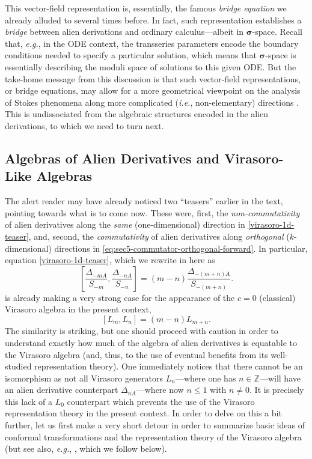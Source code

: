 \documentclass[11pt,a4paper]{article}
\def\BZ{{\mathbb Z}}
\newcommand{\be}{\begin{equation}}
\newcommand{\ee}{\end{equation}}
\begin{document}
This vector-field representation is, essentially, the famous \textit{bridge equation} we already alluded to several times before. In fact, such representation establishes a \textit{bridge} between alien derivations and ordinary calculus---albeit in $\boldsymbol{\sigma}$-space. Recall that, \textit{e.g.}, in the ODE context, the transseries parameters encode the boundary conditions needed to specify a particular solution, which means that $\boldsymbol{\sigma}$-space is essentially describing the moduli space of solutions to this given ODE. But the take-home message from this discussion is that such vector-field representations, or bridge equations, may allow for a more geometrical viewpoint on the analysis of Stokes phenomena along more complicated (\textit{i.e.}, non-elementary) directions \cite{as13}. This is undissociated from the algebraic structures encoded in the alien derivations, to which we need to turn next.

\subsection*{Algebras of Alien Derivatives and Virasoro-Like Algebras}

The alert reader may have already noticed two ``teasers'' earlier in the text, pointing towards what is to come now. These were, first, the \textit{non-commutativity} of alien derivatives along the \textit{same} (one-dimensional) direction in \eqref{virasoro-1d-teaser}, and, second, the \textit{commutativity} of alien derivatives along \textit{orthogonal} ($k$-dimensional) directions in \eqref{eq:sec5-commutator-orthogonal-forward}. In particular, equation \eqref{virasoro-1d-teaser}, which we rewrite in here as
%
\be
\label{1dALIENisVIR?}
\left[ \frac{\Delta_{-mA}}{S_{-m}}, \frac{\Delta_{-nA}}{S_{-n}} \right] = \left( m-n \right) \frac{\Delta_{-(m+n)A}}{S_{-(m+n)}}.
\ee
%
\noindent
is already making a very strong case for the appearance of the $c=0$ (classical) Virasoro algebra in the present context,
%
\be
\label{c=0-VIR}
\left[ L_m, L_n \right] = \left( m-n \right) L_{m+n}.
\ee
%
\noindent
The similarity is striking, but one should proceed with caution in order to understand exactly how much of the algebra of alien derivatives is equatable to the Virasoro algebra (and, thus, to the use of eventual benefits from its well-studied representation theory). One immediately notices that there cannot be an isomorphism as not all Virasoro generators $L_n$---where one has $n \in \BZ$---will have an alien derivative counterpart $\Delta_{nA}$---where now $n \leq 1$ with $n \neq 0$. It is precisely this lack of a $L_0$ counterpart which prevents the use of the Virasoro representation theory in the present context. In order to delve on this a bit further, let us first make a very short detour in order to summarize basic ideas of conformal transformations and the representation theory of the Virasoro algebra (but see also, \textit{e.g.}, \cite{fqs84, g91}, which we follow below).
\end{document}
